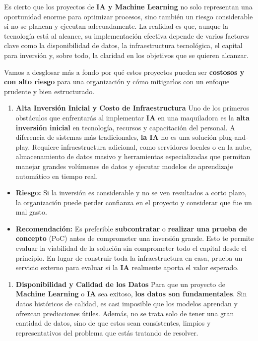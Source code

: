 \documentclass[
  10pt,
  letterpaper,
]{book}
\providecommand{\tightlist}{%
  \setlength{\itemsep}{0pt}\setlength{\parskip}{0pt}}\usepackage{longtable,booktabs,array}
\begin{document}
Es cierto que los proyectos de \textbf{IA y Machine Learning} no solo
representan una oportunidad enorme para optimizar procesos, sino también
un riesgo considerable si no se planean y ejecutan adecuadamente. La
realidad es que, aunque la tecnología está al alcance, su implementación
efectiva depende de varios factores clave como la disponibilidad de
datos, la infraestructura tecnológica, el capital para inversión y,
sobre todo, la claridad en los objetivos que se quieren alcanzar.

Vamos a desglosar más a fondo por qué estos proyectos pueden ser
\textbf{costosos y con alto riesgo} para una organización y cómo
mitigarlos con un enfoque prudente y bien estructurado.

\begin{enumerate}
\def\labelenumi{\arabic{enumi}.}
\tightlist
\item
  \textbf{Alta Inversión Inicial y Costo de Infraestructura} Uno de los
  primeros obstáculos que enfrentarás al implementar \textbf{IA} en una
  maquiladora es la \textbf{alta inversión inicial} en tecnología,
  recursos y capacitación del personal. A diferencia de sistemas más
  tradicionales, \textbf{la IA} no es una solución plug-and-play.
  Requiere infraestructura adicional, como servidores locales o en la
  nube, almacenamiento de datos masivo y herramientas especializadas que
  permitan manejar grandes volúmenes de datos y ejecutar modelos de
  aprendizaje automático en tiempo real.
\end{enumerate}

\begin{itemize}
\item
  \textbf{Riesgo:} Si la inversión es considerable y no se ven
  resultados a corto plazo, la organización puede perder confianza en el
  proyecto y considerar que fue un mal gasto.
\item
  \textbf{Recomendación:} Es preferible \textbf{subcontratar} o
  \textbf{realizar una prueba de concepto} (PoC) antes de comprometer
  una inversión grande. Esto te permite evaluar la viabilidad de la
  solución sin comprometer todo el capital desde el principio. En lugar
  de construir toda la infraestructura en casa, prueba un servicio
  externo para evaluar si la \textbf{IA} realmente aporta el valor
  esperado.
\end{itemize}

\begin{enumerate}
\def\labelenumi{\arabic{enumi}.}
\setcounter{enumi}{1}
\tightlist
\item
  \textbf{Disponibilidad y Calidad de los Datos} Para que un proyecto de
  \textbf{Machine Learning} o \textbf{IA} sea exitoso, \textbf{los datos
  son fundamentales}. Sin datos históricos de calidad, es casi imposible
  que los modelos aprendan y ofrezcan predicciones útiles. Además, no se
  trata solo de tener una gran cantidad de datos, sino de que estos sean
  consistentes, limpios y representativos del problema que estás
  tratando de resolver.
\end{enumerate}
\end{document}
